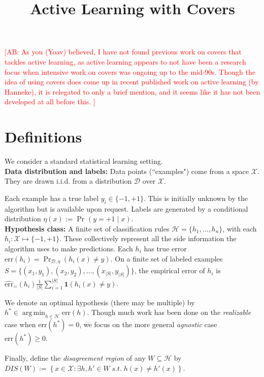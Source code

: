 \documentclass{article}[12pt]
\title{Active Learning with Covers}
\newcommand{\authcmt}[2]{\ifnum\Comments=1\textcolor{#1}{#2}\fi}
\newcommand{\akshay}[1]{\authcmt{red}      {[AB: #1]}}
\theoremstyle{named}
\DeclareMathOperator*{\argmin}{arg\,min}
\DeclareMathOperator{\Prtxt}{Pr}
\newcommand{\ifn}{\mathbf{1}} %
\newcommand{\abs}[1]{\left| #1 \right|}
\newcommand{\prp}[2]{\Prtxt_{#2} \left(#1\right)}
\newcommand{\err}[1]{\mbox{err}\left(#1\right)}
\newcommand{\emperr}[2]{\widehat{\mbox{err}}_{#2} \left(#1\right)}
\newcommand{\cH}{\mathcal{H}}
\newcommand{\cX}{\mathcal{X}}
\newcommand{\cD}{\mathcal{D}}
\begin{document}
\maketitle


\akshay{
As you (Yoav) believed, I have not found previous work on covers that tackles active learning, 
as active learning appears to 
not have been a research focus when intensive work on covers was ongoing up to the mid-90s. 
Though the idea of using covers does come up in recent published work on active learning (by Hanneke), 
it is relegated to only a brief mention, and it seems like it has not been developed at all before this. }

\section{Definitions}

We consider a standard statistical learning setting. \\

{\bf Data distribution and labels:} 
Data points (``examples") come from a space $\cX$. 
They are drawn i.i.d. from a distribution $\cD$ over $\cX$. 

Each example has a true label $y_i \in \{-1, +1\}$. 
This is initially unknown by the algorithm but is available upon request. 
Labels are generated by a conditional distribution $\eta (x) := \prp{y = +1 \mid x}{}$. \\

  
{\bf Hypothesis class:} 
A finite set of classification rules
$\cH= \{ h_1,\ldots, h_n \}$, with each $h_i : \cX \mapsto \{-1,+1\}$.
These collectively represent all the side information the algorithm uses to make predictions. 
Each $h_i$ has true error $\err{h_i} = \prp{h_i (x) \neq y}{\cD, \eta}$. 
On a finite set of labeled examples $S = \{(x_1, y_1), (x_2, y_2), \dots, (x_{\abs{S}}, y_{\abs{S}}) \}$, 
the empirical error of $h_i$ is $\emperr{h_i} = \frac{1}{\abs{S}} \sum_{i=1}^{\abs{S}} \ifn(h_i(x) \neq y)$.
  
We denote an optimal hypothesis (there may be multiple) by 
$h^* \in \argmin_{h \in \cH} \err{h}$. 
Though much work has been done on the \emph{realizable} case when $\err{h^*} = 0$, 
we focus on the more general \emph{agnostic} case $\err{h^*} \geq 0$.

Finally, define the \emph{disagreement region} of any $W \subseteq \cH$ by 
$DIS(W) := \left\{ x \in \cX : \exists h, h' \in W \;s.t.\; h(x) \neq h'(x) \right\}$. \\
\end{document}
